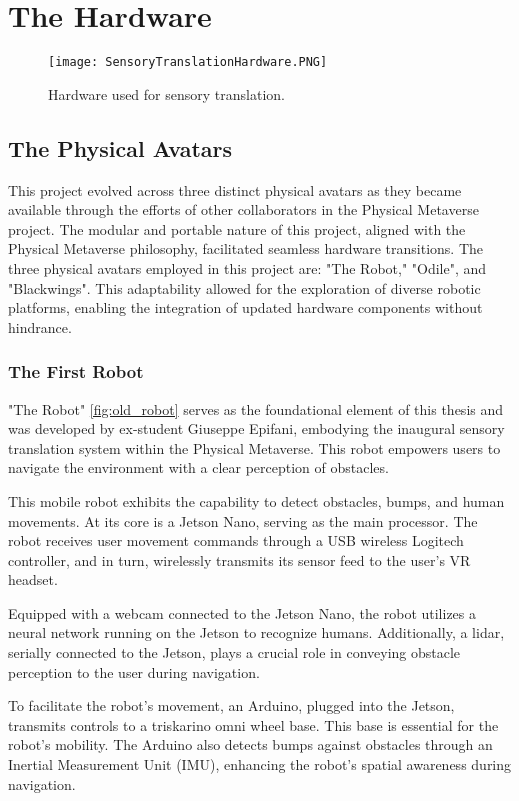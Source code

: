 \documentclass{Configuration_Files/PoliMi3i_thesis}
\begin{document}
\chapter{The Hardware}
\begin{figure}[h]
    \centering
    \texttt{[image: SensoryTranslationHardware.PNG]}
    \caption{Hardware used for sensory translation.}
    \label{fig:sensory_translation_hardware}
\end{figure}
\section{The Physical Avatars}
This project evolved across three distinct physical avatars as they became available through the efforts of other collaborators in the Physical Metaverse project. The modular and portable nature of this project, aligned with the Physical Metaverse philosophy, facilitated seamless hardware transitions. The three physical avatars employed in this project are: "The Robot," "Odile", and "Blackwings". This adaptability allowed for the exploration of diverse robotic platforms, enabling the integration of updated hardware components without hindrance.
\subsection{The First Robot}
"The Robot" \cref{fig:old_robot} serves as the foundational element of this thesis and was developed by ex-student Giuseppe Epifani, embodying the inaugural sensory translation system within the Physical Metaverse. This robot empowers users to navigate the environment with a clear perception of obstacles.

This mobile robot exhibits the capability to detect obstacles, bumps, and human movements. At its core is a Jetson Nano, serving as the main processor. The robot receives user movement commands through a USB wireless Logitech controller, and in turn, wirelessly transmits its sensor feed to the user's VR headset.

Equipped with a webcam connected to the Jetson Nano, the robot utilizes a neural network running on the Jetson to recognize humans. Additionally, a lidar, serially connected to the Jetson, plays a crucial role in conveying obstacle perception to the user during navigation.

To facilitate the robot's movement, an Arduino, plugged into the Jetson, transmits controls to a triskarino omni wheel base. This base is essential for the robot's mobility. The Arduino also detects bumps against obstacles through an Inertial Measurement Unit (IMU), enhancing the robot's spatial awareness during navigation.
\end{document}
